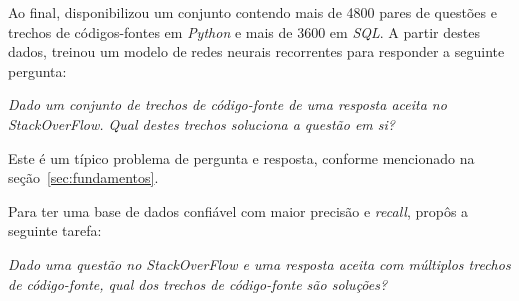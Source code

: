 Ao final, \cite{yao-2018} disponibilizou um conjunto contendo mais de 4800 pares de questões e trechos de códigos-fontes em \textit{Python} e mais de 3600 em \textit{SQL}. A partir destes dados, \cite{yao-2018} treinou um modelo de redes neurais recorrentes para responder a seguinte pergunta:

\emph{Dado um conjunto de trechos de código-fonte de uma resposta aceita no StackOverFlow. Qual destes trechos soluciona a questão em si?}

Este é um típico problema de pergunta e resposta, conforme mencionado na seção~\ref{sec:fundamentos}. 

Para ter uma base de dados confiável com maior precisão e \textit{recall}, \cite{yao-2018} propôs a seguinte tarefa:

\emph{Dado uma questão no \textit{StackOverFlow} e uma resposta aceita com múltiplos trechos de código-fonte, qual dos trechos de código-fonte são soluções?}






